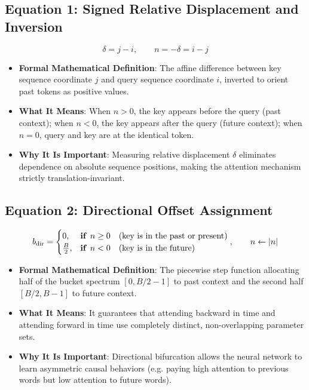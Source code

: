 \documentclass[11pt,a4paper]{article}
\theoremstyle{definition}
\begin{document}
\subsection{\textbf{Equation 1: Signed Relative Displacement and Inversion}}
{\boldmath
\begin{equation}
\delta = j - i, \qquad n = -\delta = i - j
\end{equation}
}
\begin{itemize}
    \item \textbf{Formal Mathematical Definition}:
    The affine difference between key sequence coordinate $j$ and query sequence coordinate $i$, inverted to orient past tokens as positive values.
    \item \textbf{What It Means}:
    When $n > 0$, the key appears before the query (past context); when $n < 0$, the key appears after the query (future context); when $n = 0$, query and key are at the identical token.
    \item \textbf{Why It Is Important}:
    Measuring relative displacement $\delta$ eliminates dependence on absolute sequence positions, making the attention mechanism strictly translation-invariant.
\end{itemize}

\subsection{\textbf{Equation 2: Directional Offset Assignment}}
{\boldmath
\begin{equation}
b_{\text{dir}} = \begin{cases} 0, & \text{\textbf{if }} n \ge 0 \quad (\text{key is in the past or present}) \\ \frac{B}{2}, & \text{\textbf{if }} n < 0 \quad (\text{key is in the future}) \end{cases}, \qquad n \gets |n|
\end{equation}
}
\begin{itemize}
    \item \textbf{Formal Mathematical Definition}:
    The piecewise step function allocating half of the bucket spectrum $[0, B/2 - 1]$ to past context and the second half $[B/2, B - 1]$ to future context.
    \item \textbf{What It Means}:
    It guarantees that attending backward in time and attending forward in time use completely distinct, non-overlapping parameter sets.
    \item \textbf{Why It Is Important}:
    Directional bifurcation allows the neural network to learn asymmetric causal behaviors (e.g. paying high attention to previous words but low attention to future words).
\end{itemize}
\end{document}
